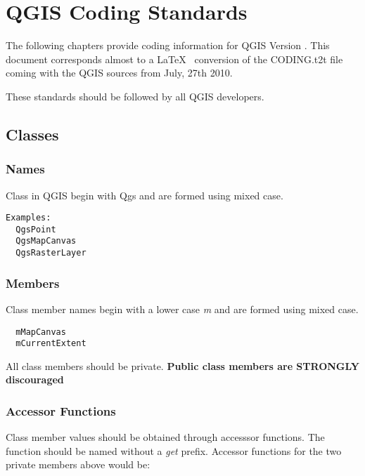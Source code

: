 

\hypertarget{toc1}{}
\section{QGIS Coding Standards}

The following chapters provide coding information for QGIS Version \CURRENT.
This document corresponds almost to a \LaTeX~ conversion of the CODING.t2t
file coming with the QGIS sources from July, 27th 2010. 

These standards should be followed by all QGIS developers.

\hypertarget{toc2}{}
\subsection{Classes}
\hypertarget{toc3}{}
\subsubsection{Names}
Class in QGIS begin with Qgs and are formed using mixed case. 

\begin{verbatim}
Examples:
  QgsPoint
  QgsMapCanvas
  QgsRasterLayer
\end{verbatim}

\hypertarget{toc4}{}
\subsubsection{Members}
Class member names begin with a lower case \textit{m} and are formed using mixed
case.

\begin{verbatim}
  mMapCanvas  
  mCurrentExtent
\end{verbatim}

All class members should be private.
\textbf{Public class members are STRONGLY discouraged}

\hypertarget{toc5}{}
\subsubsection{Accessor Functions}
Class member values should be obtained through accesssor functions. The
function should be named without a \textit{get} prefix. Accessor functions for the
two private members above would be: 

